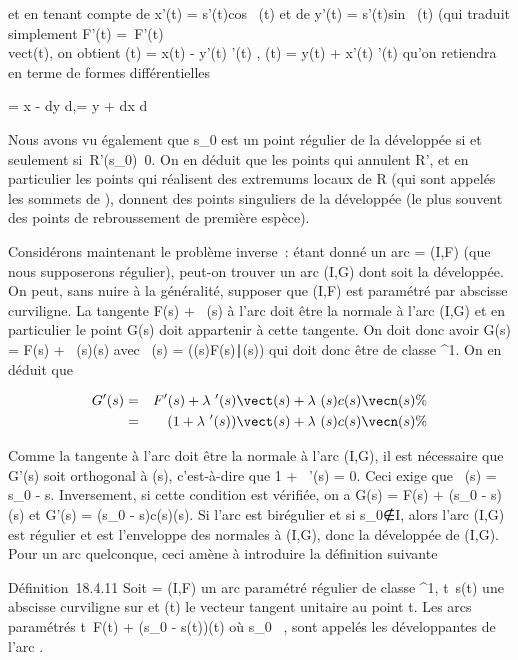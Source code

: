 \documentclass[]{article}
\begin{document}
et en tenant compte de x'(t) = s'(t)cos~ \phi(t)
et de y'(t) = s'(t)sin~ \phi(t) (qui traduit
simplement F'(t) =\
F'(t)\\vect(t), on obtient
\xi(t) = x(t) - y'(t) \over \phi'(t) , \eta(t) = y(t) +
x'(t) \over \phi'(t) qu'on retiendra en terme de formes
différentielles

\xi = x - dy \over d\phi ,\quad \eta = y +
dx \over d\phi

Nous avons vu également que s_0 est un point régulier de la
développée si et seulement
si~R'(s_0)\neq~0. On en déduit que les
points qui annulent R', et en particulier les points qui réalisent des
extremums locaux de R (qui sont appelés les sommets de \Gamma), donnent des
points singuliers de la développée (le plus souvent des points de
rebroussement de première espèce).

Considérons maintenant le problème inverse~: étant donné un arc \Gamma =
(I,F) (que nous supposerons régulier), peut-on trouver un arc (I,G) dont
\Gamma soit la développée. On peut, sans nuire à la généralité, supposer que
(I,F) est paramétré par abscisse curviligne. La tangente F(s) +
~\vect(s) à l'arc \Gamma doit être la normale à l'arc
(I,G) et en particulier le point G(s) doit appartenir à cette tangente.
On doit donc avoir G(s) = F(s) + \lambda~(s)\vect(s) avec
\lambda~(s) =
(\overrightarrowG(s)F(s)∣\vect(s))
qui doit donc être de classe ^1. On en déduit que

\begin{align*} G'(s)& =& F'(s) +
\lambda~'(s)\vect(s) +
\lambda~(s)c(s)\vecn(s)\%& \\
& =& (1 + \lambda~'(s))\vect(s) +
\lambda~(s)c(s)\vecn(s) \%&
\\ \end{align*}

Comme la tangente à l'arc \Gamma doit être la normale à l'arc (I,G), il est
nécessaire que G'(s) soit orthogonal à \vect(s),
c'est-à-dire que 1 + \lambda~'(s) = 0. Ceci exige que \lambda~(s) = s_0 - s.
Inversement, si cette condition est vérifiée, on a G(s) = F(s) +
(s_0 - s)\vect(s) et G'(s) = (s_0 -
s)c(s)\vecn(s). Si l'arc \Gamma est birégulier et si
s_0∉I, alors l'arc (I,G) est
régulier et \Gamma est l'enveloppe des normales à (I,G), donc la développée
de (I,G). Pour un arc quelconque, ceci amène à introduire la définition
suivante

Définition~18.4.11 Soit \Gamma = (I,F) un arc paramétré régulier de classe
\mathcal{C}^1, t\mapsto~s(t) une abscisse
curviligne sur \Gamma et \vect(t) le vecteur tangent
unitaire au point t. Les arcs paramétrés
t\mapsto~F(t) + (s_0 -
s(t))\vect(t) où s_0 \in {}~, sont appelés les
développantes de l'arc \Gamma.
\end{document}
